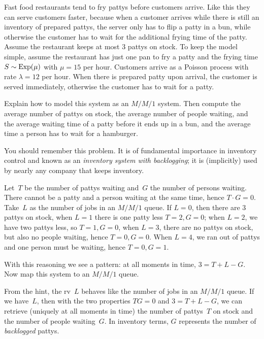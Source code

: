 \documentclass[queueing-book.tex]{subfiles}
\begin{document}
\begin{exercise}\label{ex:95}
Fast food restaurants tend to fry pattys before customers arrive.
Like this they can serve customers faster, because when a customer arrives while there is still an inventory of prepared pattys, the server only has to flip a patty in a bun, while otherwise the customer has to wait for the additional frying time of the patty.
Assume the restaurant keeps at most 3 pattys on stock.
To keep the model simple, assume the restaurant has just one pan to fry a patty and the frying time $S\sim \mathrm{Exp}(\mu)$ with $\mu = 15$ per hour.
Customers arrive as a Poisson process with rate $\lambda=12$ per hour.
When there is prepared patty upon arrival, the customer is served immediately, otherwise the customer has to wait for a patty.

Explain how to model this system as an $M/M/1$ system.  Then compute the average number of pattys on stock, the average number of people waiting, and the average waiting time of a patty before it ends up in a bun, and the average time a person has to wait for a hamburger.

You should remember this problem.
It is of fundamental importance in inventory control and known as an \emph{inventory system with backlogging}; it is (implicitly) used by nearly any company that keeps inventory.
\begin{hint}
Let~$T$ be the number of pattys waiting and~$G$ the number of persons waiting.
There cannot be a patty and a person waiting at the same time, hence $T\cdot G = 0$.
Take~$L$ as the number of jobs in an $M/M/1$ queue.
If $L=0$, then there are 3 pattys on stock, when $L=1$ there is one patty less $T=2, G=0$; when $L=2$, we have two pattys less, so $T=1, G=0$, when $L=3$, there are no pattys on stock, but also no people waiting, hence $T=0, G=0$.
When $L=4$, we ran out of pattys and one person must be waiting, hence $T=0, G=1$.

With this reasoning we see a pattern:  at all moments in time, $3=T+L - G$.
Now map this system to an $M/M/1$ queue.
\end{hint}
\begin{solution}
From the hint, the rv~$L$ behaves like the number of jobs in an $M/M/1$ queue. If we have~$L$, then with the two properties $T G = 0$ and $3 = T +L - G$, we can retrieve (uniquely at all moments in time) the number of pattys~$T$ on stock and the number of people waiting~$G$. In inventory terms, $G$ represents the number of \emph{backlogged} pattys.


\end{solution}
\end{exercise}
\end{document}
